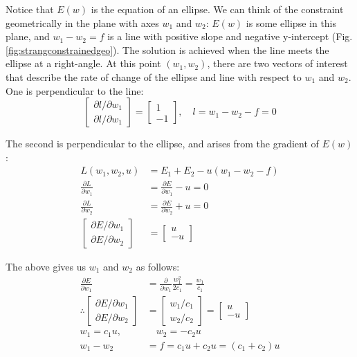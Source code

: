\documentclass[]{article}
\begin{document}
Notice that $E(w)$ is the equation of an ellipse. We can think of the constraint geometrically in the plane with axes $w_1$ and $w_2$: $E(w)$ is some ellipse in this plane, and $w_1 - w_2 = f$ is a line with positive slope and negative y-intercept (Fig. \ref{fig:strangconstrainedgeo}). The solution is achieved when the line meets the ellipse at a right-angle. At this point $(w_1 , w_2)$, there are two vectors of interest that describe the rate of change of the ellipse and line with respect to $w_1$ and $w_2$. One is perpendicular to the line: \begin{equation*}
\begin{bmatrix}
\partial l / \partial w_1 \\ \partial l / \partial w_1 
\end{bmatrix} = \begin{bmatrix}
1 \\ -1 
\end{bmatrix}, \quad l = w_1 - w_2 - f = 0
\end{equation*}

The second is perpendicular to the ellipse, and arises from the gradient of $E(w)$:
\begin{align*}
L(w_1, w_2, u) &= E_1 + E_2 - u (w_1 - w_2 - f) \\ 
\frac{\partial L}{\partial w_1} &= \frac{\partial E}{\partial w_1} - u = 0 \\
\frac{\partial L}{\partial w_2} &= \frac{\partial E}{\partial w_2} + u = 0 \\
\begin{bmatrix}
\partial E / \partial w_1 \\ \partial E / \partial w_2 
\end{bmatrix} &= \begin{bmatrix}
u \\ -u
\end{bmatrix}
\end{align*}

The above gives us $w_1$ and $w_2$ as follows:
\begin{align}
\frac{\partial E}{\partial w_1} &= \frac{\partial}{\partial w_1} \frac{w^{2}_{1}}{2c_{1}} = \frac{w_{1}}{c_{1}} \\
\therefore \begin{bmatrix}
\partial E / \partial w_1 \\ \partial E / \partial w_2 
\end{bmatrix} &= \begin{bmatrix}
w_1 / c_1 \\ w_2 / c_2 
\end{bmatrix} = \begin{bmatrix}
u \\ -u
\end{bmatrix} \\ 
w_1 = c_1 u, &\quad w_2 = -c_2 u \\
w_1 - w_2 &= f = c_1 u + c_2 u = (c_1 + c_2)u 
\end{align}
\end{document}
